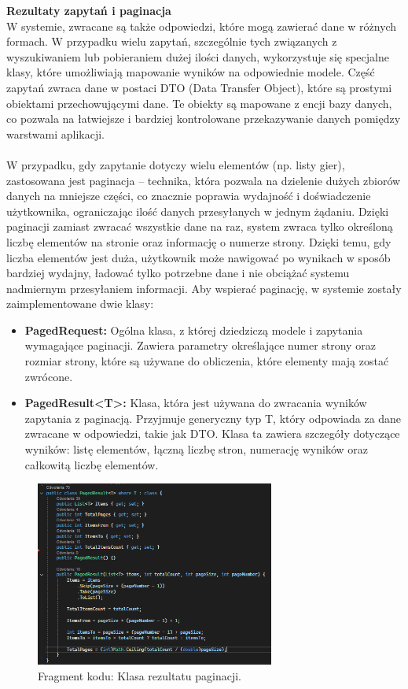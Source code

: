 \documentclass[12pt,a4paper]{article}
\begin{document}
\noindent \textbf{Rezultaty zapytań i paginacja}\\
W systemie, zwracane są także odpowiedzi, które mogą zawierać dane w różnych formach. W przypadku wielu zapytań, szczególnie tych związanych z wyszukiwaniem lub pobieraniem dużej ilości danych, wykorzystuje się specjalne klasy, które umożliwiają mapowanie wyników na odpowiednie modele. Część zapytań zwraca dane w postaci DTO (Data Transfer Object), które są prostymi obiektami przechowującymi dane. Te obiekty są mapowane z encji bazy danych, co pozwala na łatwiejsze i bardziej kontrolowane przekazywanie danych pomiędzy warstwami aplikacji.
\\\\
W przypadku, gdy zapytanie dotyczy wielu elementów (np. listy gier), zastosowana jest paginacja – technika, która pozwala na dzielenie dużych zbiorów danych na mniejsze części, co znacznie poprawia wydajność i doświadczenie użytkownika, ograniczając ilość danych przesyłanych w jednym żądaniu. Dzięki paginacji zamiast zwracać wszystkie dane na raz, system zwraca tylko określoną liczbę elementów na stronie oraz informację o numerze strony. Dzięki temu, gdy liczba elementów jest duża, użytkownik może nawigować po wynikach w sposób bardziej wydajny, ładować tylko potrzebne dane i nie obciążać systemu nadmiernym przesyłaniem informacji. Aby wspierać paginację, w systemie zostały zaimplementowane dwie klasy:

\begin{itemize}
    \item \textbf{PagedRequest:} Ogólna klasa, z której dziedziczą modele i zapytania wymagające paginacji. Zawiera parametry określające numer strony oraz rozmiar strony, które są używane do obliczenia, które elementy mają zostać zwrócone.
    \item \textbf{PagedResult<T>:} Klasa, która jest używana do zwracania wyników zapytania z paginacją. Przyjmuje generyczny typ T, który odpowiada za dane zwracane w odpowiedzi, takie jak DTO. Klasa ta zawiera szczegóły dotyczące wyników: listę elementów, łączną liczbę stron, numerację wyników oraz całkowitą liczbę elementów.
\end{itemize}

\begin{figure}[h!]
    \centering
    \includegraphics[width=0.7\textwidth]{images/ex_pagination.png}
    \caption{Fragment kodu: Klasa rezultatu paginacji.}
\end{figure}
\end{document}
